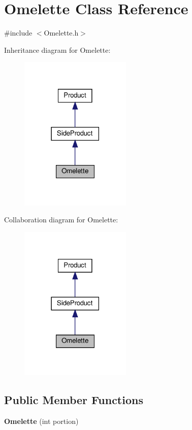 \hypertarget{classOmelette}{}\section{Omelette Class Reference}
\label{classOmelette}


{\ttfamily \#include $<$Omelette.\+h$>$}



Inheritance diagram for Omelette\+:
\nopagebreak
\begin{figure}[H]
\begin{center}
\leavevmode
\includegraphics[width=150pt]{classOmelette__inherit__graph}
\end{center}
\end{figure}


Collaboration diagram for Omelette\+:
\nopagebreak
\begin{figure}[H]
\begin{center}
\leavevmode
\includegraphics[width=150pt]{classOmelette__coll__graph}
\end{center}
\end{figure}
\subsection*{Public Member Functions}
\begin{DoxyCompactItemize}
\item 
\mbox{\label{classOmelette_a9de6bf62fb9cfad149092418704da6d2}} 
{\bfseries Omelette} (int portion)
\end{DoxyCompactItemize}
